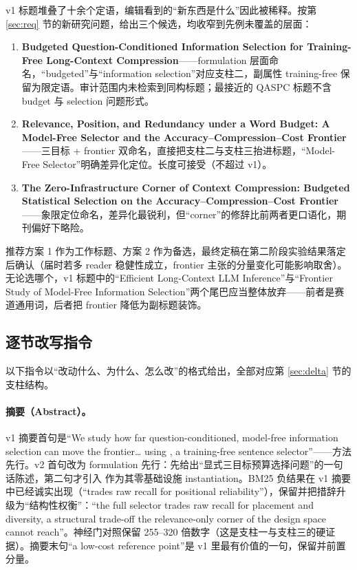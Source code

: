 v1 标题堆叠了十余个定语，编辑看到的``新东西是什么''因此被稀释。按第 \ref{sec:req} 节的新研究问题，给出三个候选，均收窄到先例未覆盖的层面：

\begin{enumerate}[itemsep=2pt]
\item \textbf{Budgeted Question-Conditioned Information Selection for Training-Free Long-Context Compression}——formulation 层面命名，``budgeted''与``information selection''对应支柱二，副属性 training-free 保留为限定语。审计范围内未检索到同构标题；最接近的 QASPC 标题不含 budget 与 selection 问题形式。
\item \textbf{Relevance, Position, and Redundancy under a Word Budget: A Model-Free Selector and the Accuracy--Compression--Cost Frontier}——三目标 + frontier 双命名，直接把支柱二与支柱三抬进标题，``Model-Free Selector''明确差异化定位。长度可接受（不超过 v1）。
\item \textbf{The Zero-Infrastructure Corner of Context Compression: Budgeted Statistical Selection on the Accuracy--Compression--Cost Frontier}——象限定位命名，差异化最锐利，但``corner''的修辞比前两者更口语化，期刊偏好下略险。
\end{enumerate}

推荐方案 1 作为工作标题、方案 2 作为备选，最终定稿在第二阶段实验结果落定后确认（届时若多 reader 稳健性成立，frontier 主张的分量变化可能影响取舍）。无论选哪个，v1 标题中的``Efficient Long-Context LLM Inference''与``Frontier Study of Model-Free Information Selection''两个尾巴应当整体放弃——前者是赛道通用词，后者把 frontier 降低为副标题装饰。

\subsection{逐节改写指令}

以下指令以``改动什么、为什么、怎么改''的格式给出，全部对应第 \ref{sec:delta} 节的支柱结构。

\paragraph{摘要（Abstract）。}
v1 摘要首句是``We study how far question-conditioned, model-free information selection can move the frontier\dots{} using \sieve{}, a training-free sentence selector''——方法先行。v2 首句改为 formulation 先行：先给出``显式三目标预算选择问题''的一句话陈述，第二句才引入 \sieve{} 作为其零基础设施 instantiation。BM25 负结果在 v1 摘要中已经诚实出现（``trades raw recall for positional reliability''），保留并把措辞升级为``结构性权衡''：``the full selector trades raw recall for placement and diversity, a structural trade-off the relevance-only corner of the design space cannot reach''。神经门对照保留 255--320 倍数字（这是支柱一与支柱三的硬证据）。摘要末句``a low-cost reference point''是 v1 里最有价值的一句，保留并前置分量。

